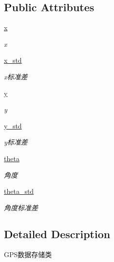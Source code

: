 \subsection*{Public Attributes}
\begin{DoxyCompactItemize}
\item 
\hyperlink{classselect___a__dox_1_1_g_p_s__unit_a9f6e295605effc946a8ce6f8cb526964}{x}
\begin{DoxyCompactList}\small\item\em x \end{DoxyCompactList}\item 
\hyperlink{classselect___a__dox_1_1_g_p_s__unit_a16f6534288d3f67c9c01aa44fc3d28aa}{x\+\_\+std}
\begin{DoxyCompactList}\small\item\em x标准差 \end{DoxyCompactList}\item 
\hyperlink{classselect___a__dox_1_1_g_p_s__unit_a741af218ee69586ee6653914a07c4277}{y}
\begin{DoxyCompactList}\small\item\em y \end{DoxyCompactList}\item 
\hyperlink{classselect___a__dox_1_1_g_p_s__unit_a1f123d34a210d5399305a13d608af4ed}{y\+\_\+std}
\begin{DoxyCompactList}\small\item\em y标准差 \end{DoxyCompactList}\item 
\hyperlink{classselect___a__dox_1_1_g_p_s__unit_a4b964c306cd5e95f2dccb8000a39304e}{theta}
\begin{DoxyCompactList}\small\item\em 角度 \end{DoxyCompactList}\item 
\hyperlink{classselect___a__dox_1_1_g_p_s__unit_ad7bfc54e5c4577fbc4b3d9bad886e91e}{theta\+\_\+std}
\begin{DoxyCompactList}\small\item\em 角度标准差 \end{DoxyCompactList}\end{DoxyCompactItemize}


\subsection{Detailed Description}
G\+P\+S数据存储类 



